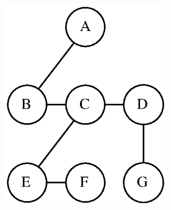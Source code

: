 \documentclass[aspectratio=169]{beamer}
\begin{document}
\begin{frame}
\begin{columns}[T]
\begin{column}{0.75\linewidth}
\begin{figure}[h]
	\includegraphics[height=0.3\paperheight]{imagens/arvore_b-v2.eps}
\end{figure}
\end{column}
\begin{column}{0.25\linewidth}
\begin{figure}[h]
	\centering

\end{figure}
\end{column}
\end{columns}
\end{frame}
\end{document}
